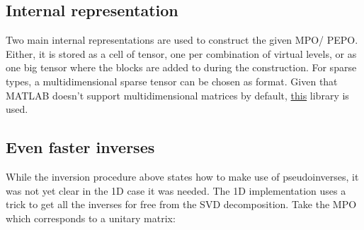 \subsection{Internal representation}

Two main internal representations are used to construct the given \Gls{MPO}/ \Gls{PEPO}. Either, it is stored as a cell of tensor, one per combination of virtual levels, or as one big tensor where the blocks are added to during the construction. For sparse types, a multidimensional sparse tensor can be chosen as format. Given that MATLAB doesn't support multidimensional matrices by default, \href{https://nl.mathworks.com/matlabcentral/fileexchange/29832-n-dimensional-sparse-arrays}{this}\cite{Matt} library is used.

\subsection{Even faster inverses}



While the inversion procedure above states how to make use of pseudoinverses, it was not yet clear in the 1D case it was needed. The 1D implementation uses a trick to get all the inverses for free from the \Gls{SVD} decomposition. Take the \Gls{MPO} which corresponds to a unitary matrix:




